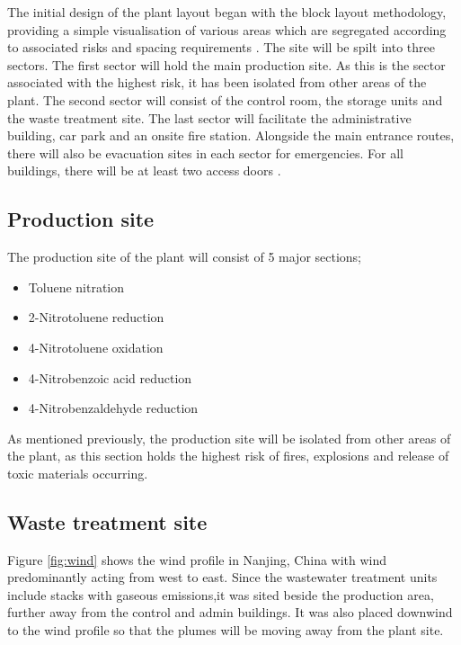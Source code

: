 The initial design of the plant layout began with the block layout methodology, providing a simple visualisation of various areas which are segregated according to associated risks and spacing requirements \cite{center_for_chemical_process_safety_site_2010}. The site will be spilt into three sectors. The first sector will hold the main production site. As this is the sector associated with the highest risk, it has been isolated from other areas of the plant. The second sector will consist of the control room, the storage units and the waste treatment site. The last sector will facilitate the administrative building, car park and an onsite fire station. Alongside the main entrance routes, there will also be evacuation sites in each sector for emergencies. For all buildings, there will be at least two access doors \cite{aiche_dows_1994}.






\subsection{Production site}

The production site of the plant will consist of 5 major sections; 

\begin{itemize}
    \item Toluene nitration
    \item 2-Nitrotoluene reduction 
    \item 4-Nitrotoluene oxidation 
    \item 4-Nitrobenzoic acid reduction 
    \item 4-Nitrobenzaldehyde reduction 
\end{itemize}

As mentioned previously, the production site will be isolated from other areas of the plant, as this section holds the highest risk of fires, explosions  and release of toxic materials occurring. 

\subsection{Waste treatment site}

Figure \ref{fig:wind} shows the wind profile in Nanjing, China with wind predominantly acting from west to east. Since the wastewater treatment units include stacks with gaseous emissions,it was sited beside the production area, further away from the control and admin buildings. It was also placed downwind to the wind profile so that the plumes will be moving away from the plant site. 

